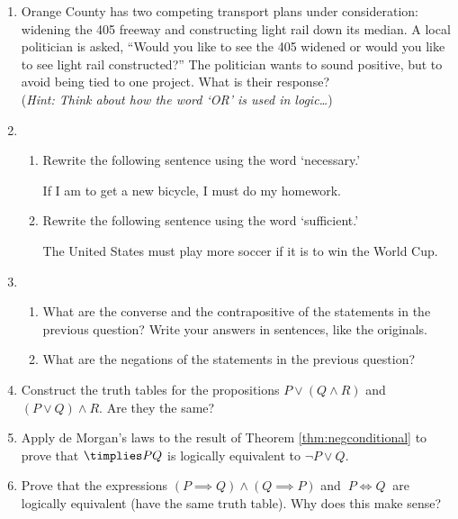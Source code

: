 \begin{enumerate}
  \item Orange County has two competing transport plans under consideration: widening the 405 freeway and constructing light rail down its median. A local politician is asked, ``Would you like to see the 405 widened or would you like to see light rail constructed?'' The politician wants to sound positive, but to avoid being tied to one project. What is their response?\\
  (\emph{Hint: Think about how the word `OR' is used in logic\ldots})
  
  \item\begin{enumerate}
    \item Rewrite the following sentence using the word `necessary.'
  	\begin{center}
  		If I am to get a new bicycle, I must do my homework.
  	\end{center}
  
  	\item Rewrite the following sentence using the word `sufficient.'
  	\begin{center}
  		The United States must play more soccer if it is to win the World Cup.
  	\end{center}
  \end{enumerate}
  
  \item\begin{enumerate}
    \item What are the converse and the contrapositive of the statements in the previous question? Write your answers in sentences, like the originals.
  	\item What are the negations of the statements in the previous question?
  \end{enumerate} 
  
  \item Construct the truth tables for the propositions $P\vee(Q\wedge R)$ and $(P\vee Q)\wedge R$. Are they the same?
  
  \item\label{ex:demorganimplies} Apply de Morgan's laws to the result of Theorem \ref{thm:negconditional}  to prove that $\timplies PQ$ is logically equivalent to $\neg P\vee Q$.

  \item Prove that the expressions $(P\implies Q)\wedge (Q\implies P)$ and $\ P\iff Q\ $ are logically equivalent (have the same truth table). Why does this make sense?
  

\end{enumerate}
